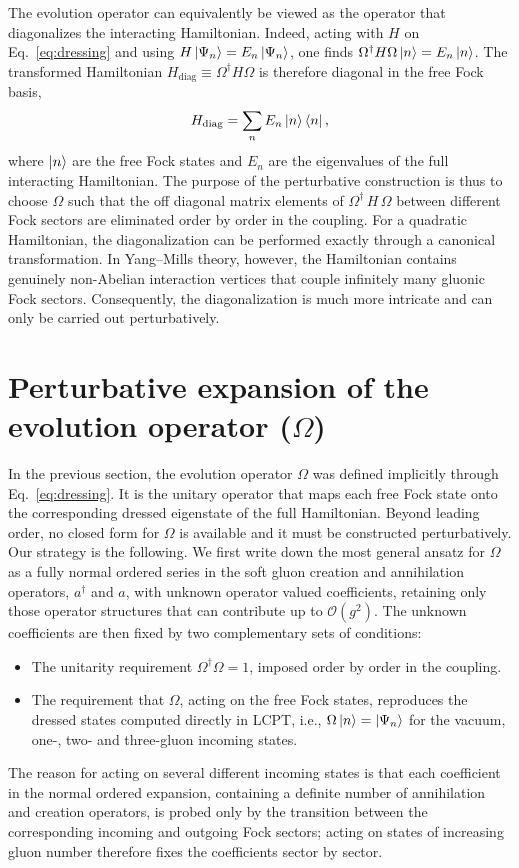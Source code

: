 \documentclass[a4paper,11pt]{article}
\begin{document}
The evolution operator can equivalently be viewed as the operator that diagonalizes the interacting Hamiltonian. Indeed, acting with $H$ on Eq.~\eqref{eq:dressing} and using $H\ket{\Psi_{n}} = E_{n}\ket{\Psi_{n}}$, one finds $\Omega^{\dagger}H\Omega\ket{n} = E_{n}\ket{n}$. The transformed Hamiltonian $H_{\text{diag}}\equiv \Omega^{\dagger} H \Omega$ is therefore diagonal in the free Fock basis,
\begin{align}
H_{\text{diag}} = \sum_{n}E_{n}\ket{n}\bra{n},
\end{align}
where $\ket{n}$ are the free Fock states and $E_{n}$ are the eigenvalues of the full interacting Hamiltonian. The purpose of the perturbative construction is thus to choose $\Omega$ such that the off diagonal matrix elements of $\Omega^{\dagger}\,H\,\Omega$ between different Fock sectors are eliminated order by order in the coupling. For a quadratic Hamiltonian, the diagonalization can be performed exactly through a canonical transformation. In Yang–Mills theory, however, the Hamiltonian contains genuinely non-Abelian interaction vertices that couple infinitely many gluonic Fock sectors. Consequently, the diagonalization is much more intricate and can only be carried out perturbatively.

\section{Perturbative expansion of the evolution operator ($\Omega$)} \label{sec:Omega}
In the previous section, the evolution operator $\Omega$ was defined implicitly through Eq.~\eqref{eq:dressing}. It is the unitary operator that maps each free Fock state onto the corresponding dressed eigenstate of the full Hamiltonian. Beyond leading order, no closed form for $\Omega$ is available and it must be constructed perturbatively. Our strategy is the following. We first write down the most general ansatz for $\Omega$ as a fully normal ordered series in the soft gluon creation and annihilation operators, $a^{\dagger}$ and $a$, with unknown operator valued coefficients, retaining only those operator structures that can contribute up to $\mathcal{O}(g^{2})$. The unknown coefficients are then fixed by two complementary sets of conditions: 
\begin{itemize}
    \item The unitarity requirement $\Omega^{\dagger}\Omega=1$, imposed order by order in the coupling. 
    \item The requirement that $\Omega$, acting on the free Fock states, reproduces the dressed states computed directly in LCPT, i.e., $\Omega\ket{n} = \ket{\Psi_{n}}$ for the vacuum, one-, two- and three-gluon incoming states.
\end{itemize}    
The reason for acting on several different incoming states is that each coefficient in the normal ordered expansion, containing a definite number of annihilation and creation operators, is probed only by the transition between the corresponding incoming and outgoing Fock sectors; acting on states of increasing gluon number therefore fixes the coefficients sector by sector.
\end{document}
